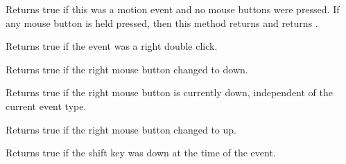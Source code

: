 \label{wxmouseeventmoving}


Returns true if this was a motion event and no mouse buttons were pressed. 
If any mouse button is held pressed, then this method returns \false and 
 returns \true.


\label{wxmouseeventrightdclick}


Returns true if the event was a right double click.


\label{wxmouseeventrightdown}


Returns true if the right mouse button changed to down.


\label{wxmouseeventrightisdown}


Returns true if the right mouse button is currently down, independent
of the current event type.


\label{wxmouseeventrightup}


Returns true if the right mouse button changed to up.


\label{wxmouseeventshiftdown}


Returns true if the shift key was down at the time of the event.

